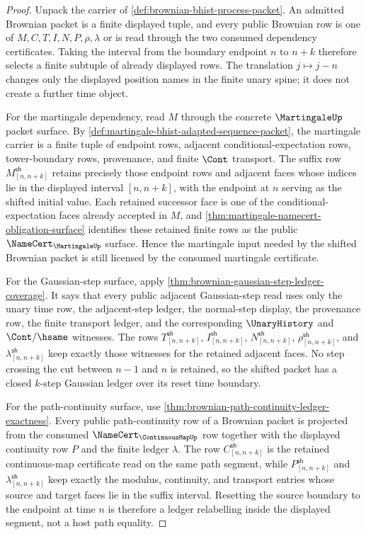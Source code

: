 \begin{proof}
Unpack the carrier of \autoref{def:brownian-bhist-process-packet}. An admitted
Brownian packet is a finite displayed tuple, and every public Brownian row is
one of $M,C,T,I,N,P,\rho,\lambda$ or is read through the two consumed
dependency certificates. Taking the interval from the boundary endpoint $n$ to
$n+k$ therefore selects a finite subtuple of already displayed rows. The
translation $j\mapsto j-n$ changes only the displayed position names in the
finite unary spine; it does not create a further time object.

For the martingale dependency, read $M$ through the concrete
$\MartingaleUp$ packet surface. By
\autoref{def:martingale-bhist-adapted-sequence-packet}, the martingale carrier
is a finite tuple of endpoint rows, adjacent conditional-expectation rows,
tower-boundary rows, provenance, and finite $\Cont$ transport. The suffix row
$M_{[n,n+k]}^{\mathsf{sh}}$ retains precisely those endpoint rows and adjacent
faces whose indices lie in the displayed interval $[n,n+k]$, with the endpoint
at $n$ serving as the shifted initial value. Each retained successor face is
one of the conditional-expectation faces already accepted in $M$, and
\autoref{thm:martingale-namecert-obligation-surface} identifies these retained
finite rows as the public $\NameCert_{\MartingaleUp}$ surface. Hence the
martingale input needed by the shifted Brownian packet is still licensed by the
consumed martingale certificate.

For the Gaussian-step surface, apply
\autoref{thm:brownian-gaussian-step-ledger-coverage}. It says that every public
adjacent Gaussian-step read uses only the unary time row, the adjacent-step
ledger, the normal-step display, the provenance row, the finite transport
ledger, and the corresponding $\UnaryHistory$ and $\Cont/\hsame$ witnesses.
The rows $T_{[n,n+k]}^{\mathsf{sh}}$,
$I_{[n,n+k]}^{\mathsf{sh}}$, $N_{[n,n+k]}^{\mathsf{sh}}$,
$\rho_{[n,n+k]}^{\mathsf{sh}}$, and
$\lambda_{[n,n+k]}^{\mathsf{sh}}$ keep exactly those witnesses for the retained
adjacent faces. No step crossing the cut between $n-1$ and $n$ is retained, so
the shifted packet has a closed $k$-step Gaussian ledger over its reset time
boundary.

For the path-continuity surface, use
\autoref{thm:brownian-path-continuity-ledger-exactness}. Every public
path-continuity row of a Brownian packet is projected from the consumed
$\NameCert_{\ContinuousMapUp}$ row together with the displayed continuity row
$P$ and the finite ledger $\lambda$. The row
$C_{[n,n+k]}^{\mathsf{sh}}$ is the retained continuous-map certificate read on
the same path segment, while $P_{[n,n+k]}^{\mathsf{sh}}$ and
$\lambda_{[n,n+k]}^{\mathsf{sh}}$ keep exactly the modulus, continuity, and
transport entries whose source and target faces lie in the suffix interval.
Resetting the source boundary to the endpoint at time $n$ is therefore a
ledger relabelling inside the displayed segment, not a host path equality.


\end{proof}
